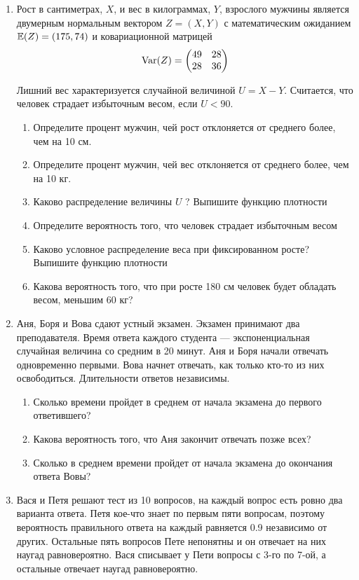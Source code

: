\documentclass[12pt, a4paper]{article}\usepackage[]{graphicx}\usepackage[]{color}
\begin{document}
\begin{enumerate}
\item Рост в сантиметрах, $X$, и вес в килограммах, $Y$, взрослого мужчины является двумерным нормальным вектором
$Z=(X,Y)$ с математическим ожиданием $\mathbb{E}(Z)=(175,74)$ и ковариационной матрицей
\[
\operatorname{Var}(Z)=
\begin{pmatrix}
49 & 28 \\
28 & 36
\end{pmatrix}
\]


Лишний вес характеризуется случайной величиной $U=X-Y$. Считается, что человек страдает избыточным весом, если $U<90$.
\begin{enumerate}
\item Определите процент мужчин, чей рост отклоняется от среднего более, чем на 10 см.
\item Определите процент мужчин, чей вес отклоняется от среднего более, чем на 10 кг.
\item Каково распределение величины $U$ ? Выпишите функцию плотности
\item Определите вероятность того, что человек страдает избыточным весом
\item Каково условное распределение веса при фиксированном росте? Выпишите функцию плотности
\item Какова вероятность того, что при росте 180 см человек будет обладать весом, меньшим 60 кг?
\end{enumerate}

\newpage


\item Аня, Боря и Вова сдают устный экзамен. Экзамен принимают два преподавателя. Время ответа каждого студента — экспоненциальная случайная величина со средним в 20 минут. Аня и Боря начали отвечать одновременно первыми. Вова начнет отвечать, как только кто-то из них освободиться. Длительности ответов независимы.

\begin{enumerate}
\item Сколько времени пройдет в среднем от начала экзамена до первого ответившего?
\item Какова вероятность того, что Аня закончит отвечать позже всех?
\item Сколько в среднем времени пройдет от начала экзамена до окончания ответа Вовы?
\end{enumerate}

\item Вася и Петя решают тест из 10 вопросов, на каждый вопрос есть ровно два варианта ответа. Петя кое-что знает по первым пяти вопросам, поэтому вероятность правильного ответа на каждый равняется 0.9 независимо от других. Остальные пять вопросов Пете непонятны и он отвечает на них наугад равновероятно. Вася списывает у Пети вопросы с 3-го по 7-ой, а остальные отвечает наугад равновероятно.


\end{enumerate}
\end{document}
